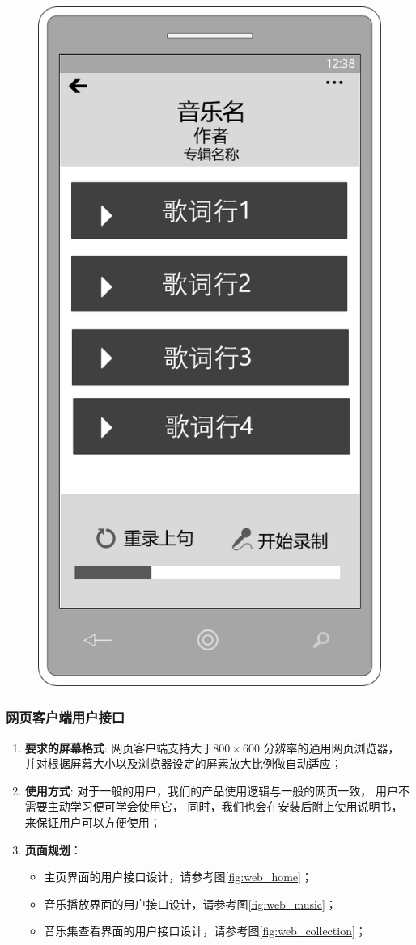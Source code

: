 \begin{figure}[h!]
  \centering

  \includegraphics[width=.37\linewidth]{figures/mobile_K}

  \caption{  \label{fig:mobile_K}
    }
\end{figure}

\subsubsection{网页客户端用户接口} %

\begin{enumerate}
	\item \textbf{要求的屏幕格式}:
		网页客户端支持大于$800 \times 600$ 分辨率的通用网页浏览器，
		并对根据屏幕大小以及浏览器设定的屏素放大比例做自动适应；
	\item \textbf{使用方式}:
		对于一般的用户，我们的产品使用逻辑与一般的网页一致，
			用户不需要主动学习便可学会使用它，
		同时，我们也会在安装后附上使用说明书，来保证用户可以方便使用；
	\item \textbf{页面规划}： 
	\begin{itemize}
		\item 主页界面的用户接口设计，请参考图\ref{fig:web_home}；
		\item 音乐播放界面的用户接口设计，请参考图\ref{fig:web_music}；
		\item 音乐集查看界面的用户接口设计，请参考图\ref{fig:web_collection}；
	\end{itemize}
\end{enumerate}

